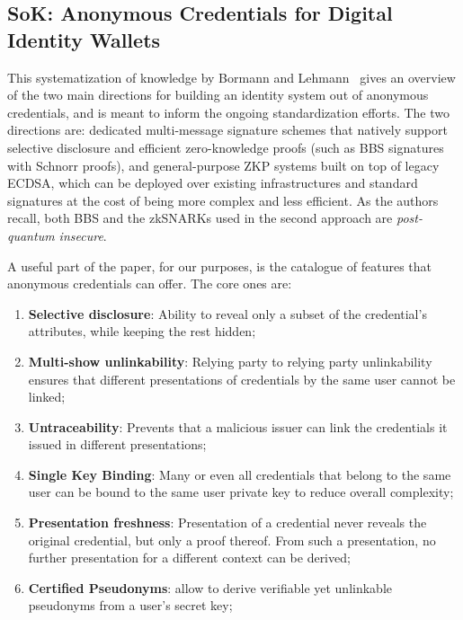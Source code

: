 \documentclass{article}
\begin{document}
\subsection{SoK: Anonymous Credentials for Digital Identity Wallets}
\label{sokancred}
This systematization of knowledge by Bormann and Lehmann~\cite{Bormann2026SoK} gives an overview of the two main
directions for building an identity system out of anonymous credentials, and is meant to inform the ongoing
standardization efforts. The two directions are: dedicated multi-message signature schemes that natively support
selective disclosure and efficient zero-knowledge proofs (such as BBS signatures with Schnorr proofs), and
general-purpose ZKP systems built on top of legacy ECDSA, which can be deployed over existing infrastructures and
standard signatures at the cost of being more complex and less efficient. As the authors recall, both BBS and the
zkSNARKs used in the second approach are \emph{post-quantum insecure}.

A useful part of the paper, for our purposes, is the catalogue of features that anonymous credentials can offer. The core ones are:
\begin{enumerate}
      \item \textbf{Selective disclosure}: Ability to reveal only a subset of the credential's attributes, while keeping the rest hidden;
      \item \textbf{Multi-show unlinkability}: Relying party to relying party unlinkability ensures that different presentations of credentials by the same user cannot be linked;
      \item \textbf{Untraceability}: Prevents that a malicious issuer can link the credentials it issued in different presentations;
      \item \textbf{Single Key Binding}: Many or even all credentials that belong to the same user can be bound to the same user private key to reduce overall complexity;
      \item \textbf{Presentation freshness}: Presentation of a credential never reveals the original credential, but only a proof thereof.  From such a presentation, no further presentation for a different context can be derived;
      \item \textbf{Certified Pseudonyms}: allow to derive verifiable yet unlinkable pseudonyms from a user’s secret key;
\end{enumerate}
\end{document}
